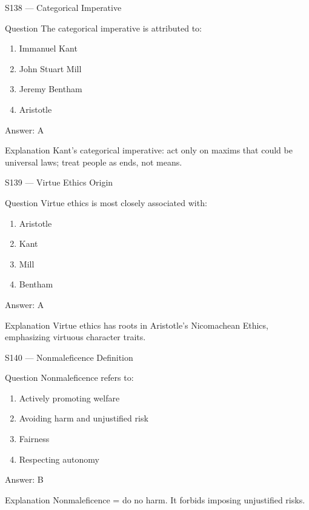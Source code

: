 \documentclass[aspectratio=169,8pt]{beamer}
\begin{document}
	\begin{frame}{S138 --- Categorical Imperative}
		\begin{block}{Question}
			The categorical imperative is attributed to:
			\begin{enumerate}
				\item Immanuel Kant
				\item John Stuart Mill
				\item Jeremy Bentham
				\item Aristotle
			\end{enumerate}
		\end{block}
		\begin{exampleblock}{Answer: A}\end{exampleblock}
		\begin{block}{Explanation}
			Kant's categorical imperative: act only on maxims that could be universal laws; treat people as ends, not means.
		\end{block}
	\end{frame}
	
	\begin{frame}{S139 --- Virtue Ethics Origin}
		\begin{block}{Question}
			Virtue ethics is most closely associated with:
			\begin{enumerate}
				\item Aristotle
				\item Kant
				\item Mill
				\item Bentham
			\end{enumerate}
		\end{block}
		\begin{exampleblock}{Answer: A}\end{exampleblock}
		\begin{block}{Explanation}
			Virtue ethics has roots in Aristotle's Nicomachean Ethics, emphasizing virtuous character traits.
		\end{block}
	\end{frame}
	
	\begin{frame}{S140 --- Nonmaleficence Definition}
		\begin{block}{Question}
			Nonmaleficence refers to:
			\begin{enumerate}
				\item Actively promoting welfare
				\item Avoiding harm and unjustified risk
				\item Fairness
				\item Respecting autonomy
			\end{enumerate}
		\end{block}
		\begin{exampleblock}{Answer: B}\end{exampleblock}
		\begin{block}{Explanation}
			Nonmaleficence = do no harm. It forbids imposing unjustified risks.
		\end{block}
	\end{frame}
	
\end{document}
